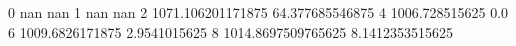 0 nan nan
1 nan nan
2 1071.106201171875 64.377685546875
4 1006.728515625 0.0
6 1009.6826171875 2.9541015625
8 1014.8697509765625 8.1412353515625
